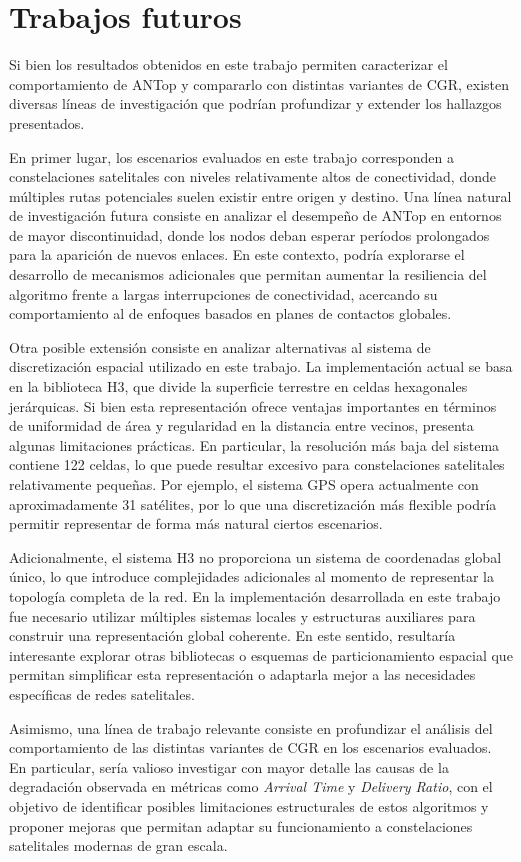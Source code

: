 \section{Trabajos futuros}

Si bien los resultados obtenidos en este trabajo permiten caracterizar el comportamiento de ANTop y compararlo con distintas variantes de CGR, existen diversas líneas de investigación que podrían profundizar y extender los hallazgos presentados.

En primer lugar, los escenarios evaluados en este trabajo corresponden a constelaciones satelitales con niveles relativamente altos de conectividad, donde múltiples rutas potenciales suelen existir entre origen y destino. Una línea natural de investigación futura consiste en analizar el desempeño de ANTop en entornos de mayor discontinuidad, donde los nodos deban esperar períodos prolongados para la aparición de nuevos enlaces. En este contexto, podría explorarse el desarrollo de mecanismos adicionales que permitan aumentar la resiliencia del algoritmo frente a largas interrupciones de conectividad, acercando su comportamiento al de enfoques basados en planes de contactos globales.

Otra posible extensión consiste en analizar alternativas al sistema de discretización espacial utilizado en este trabajo. La implementación actual se basa en la biblioteca H3, que divide la superficie terrestre en celdas hexagonales jerárquicas. Si bien esta representación ofrece ventajas importantes en términos de uniformidad de área y regularidad en la distancia entre vecinos, presenta algunas limitaciones prácticas. En particular, la resolución más baja del sistema contiene 122 celdas, lo que puede resultar excesivo para constelaciones satelitales relativamente pequeñas. Por ejemplo, el sistema GPS opera actualmente con aproximadamente 31 satélites, por lo que una discretización más flexible podría permitir representar de forma más natural ciertos escenarios.

Adicionalmente, el sistema H3 no proporciona un sistema de coordenadas global único, lo que introduce complejidades adicionales al momento de representar la topología completa de la red. En la implementación desarrollada en este trabajo fue necesario utilizar múltiples sistemas locales y estructuras auxiliares para construir una representación global coherente. En este sentido, resultaría interesante explorar otras bibliotecas o esquemas de particionamiento espacial que permitan simplificar esta representación o adaptarla mejor a las necesidades específicas de redes satelitales.

Asimismo, una línea de trabajo relevante consiste en profundizar el análisis del comportamiento de las distintas variantes de CGR en los escenarios evaluados. En particular, sería valioso investigar con mayor detalle las causas de la degradación observada en métricas como \textit{Arrival Time} y \textit{Delivery Ratio}, con el objetivo de identificar posibles limitaciones estructurales de estos algoritmos y proponer mejoras que permitan adaptar su funcionamiento a constelaciones satelitales modernas de gran escala.
